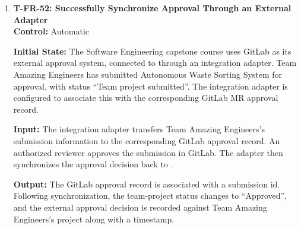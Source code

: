 \documentclass[12pt, titlepage]{article}
\begin{document}
\begin{enumerate}
\textbf{Input:} Team Amazing Engineers proposes changing the project objective to ``Develop a computer vision system capable of identifying and sorting plastic, metal, and paper waste''.

\textbf{Output:} The proposed change is submitted for instructor review. The team-project status is displayed as ``Approved (change under review)''. The original approved objective remains effective until the instructor accepts the change. The proposed objective is retained separately for review without overwriting the approved record.

\textbf{Test Case Derivation:} Derived from \texttt{FR\_ApprovalRevision} and Section 7.2 of the SRS. The requirement states that a previously approved project must retain its approval while a proposed modification awaits review. Therefore, the Objective does not change while the instructor acceptance is pending. Only an accepted revision may replace the original approved objective.

\textbf{How Test Will Be Performed:} Configure the approved team-project with its original objective. Using Playwright, authenticate as an authorized Team Amazing Engineers member and submit the proposed change. Verify the pending-change status, preservation of the original approved objective, and availability of the proposed objective for instructor review.

\item \label{T-FR-52}\textbf{T-FR-52: Successfully Synchronize Approval Through an External Adapter}\\

\textbf{Control:} Automatic

\textbf{Initial State:} The Software Engineering capstone course uses GitLab as its external approval system, connected to \projname{} through an integration adapter. Team Amazing Engineers has submitted Autonomous Waste Sorting System for approval, with status ``Team project submitted''. The integration adapter is configured to associate this with the corresponding GitLab MR approval record.

\textbf{Input:} The integration adapter transfers Team Amazing Engineers's submission information to the corresponding GitLab approval record. An authorized reviewer approves the submission in GitLab. The adapter then synchronizes the approval decision back to \projname{}.

\textbf{Output:} The GitLab approval record is associated with a \projname{} submission id. Following synchronization, the team-project status changes to ``Approved'', and the external approval decision is recorded against Team Amazing Engineers's project along with a timestamp.


\end{enumerate}
\end{document}
